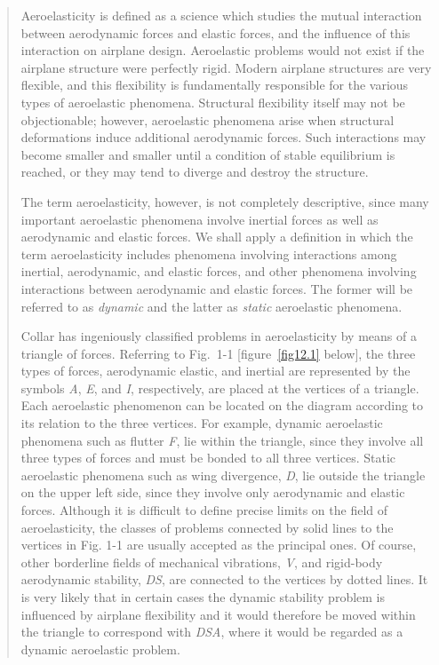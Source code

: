 \documentclass{AeroStructure-ERJohnson}
\begin{document}
\begin{quote}
Aeroelasticity is defined as a science which studies the mutual interaction between aerodynamic forces and elastic forces, and the influence of this interaction on airplane design. Aeroelastic problems would not exist if the airplane structure were perfectly rigid. Modern airplane structures are very flexible, and this flexibility is fundamentally responsible for the various types of aeroelastic phenomena. Structural flexibility itself may not be objectionable; however, aeroelastic phenomena arise when structural deformations induce additional aerodynamic forces. Such interactions may become smaller and smaller until a condition of stable equilibrium is reached, or they may tend to diverge and destroy the structure.

The term aeroelasticity, however, is not completely descriptive, since many important aeroelastic phenomena involve inertial forces as well as aerodynamic and elastic forces. We shall apply a definition in which the term aeroelasticity includes phenomena involving interactions among inertial, aerodynamic, and elastic forces, and other phenomena involving interactions between aerodynamic and elastic forces. The former will be referred to as \textit{dynamic} and the latter as \textit{static} aeroelastic phenomena.

Collar has ingeniously classified problems in aeroelasticity by means of a triangle of forces. Referring to Fig.~1-1
[figure~\ref{fig12.1} below], the three types of forces, aerodynamic elastic, and inertial are represented by the symbols \textit{A}, \textit{E}, and \textit{I}, respectively, are placed at the vertices of a triangle. Each aeroelastic phenomenon can be located on the diagram according to its relation to the three vertices. For example, dynamic aeroelastic phenomena such as flutter \textit{F}, lie within the triangle, since they involve all three types of forces and must be bonded to all three vertices. Static aeroelastic phenomena such as wing divergence, \textit{D}, lie outside the triangle on the upper left side, since they involve only aerodynamic and elastic forces. Although it is difficult to define precise limits on the field of aeroelasticity, the classes of problems connected by solid lines to the vertices in Fig. 1-1 are usually accepted as the principal ones. Of course, other borderline fields of mechanical vibrations, \textit{V}, and rigid-body aerodynamic stability, \textit{DS}, are connected to the vertices by dotted lines. It is very likely that in certain cases the dynamic stability problem is influenced by airplane flexibility and it would therefore be moved within the triangle to correspond with \textit{DSA}, where it would be regarded as a dynamic aeroelastic problem.


\end{quote}
\end{document}
